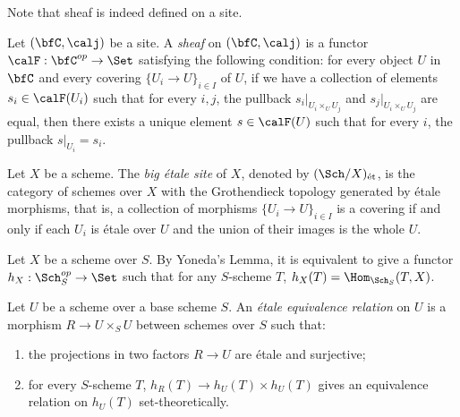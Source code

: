     Note that sheaf is indeed defined on a site.

    \begin{definition}\label{def:sheaves_on_site}
        Let \((\bfC, \calj)\) be a site.
        A \emph{sheaf} on \((\bfC, \calj)\) is a functor \(\calF: \bfC^{op} \to \Set\) satisfying the following condition:
        for every object \(U\) in \(\bfC\) and every covering \(\{U_i \to U\}_{i \in I}\) of \(U\), 
        if we have a collection of elements \(s_i \in \calF(U_i)\) such that for every \(i,j\), 
        the pullback \(s_i|_{U_i \times_U U_j}\) and \(s_j|_{U_i \times_U U_j}\) are equal, 
        then there exists a unique element \(s \in \calF(U)\) such that for every \(i\), the pullback \(s|_{U_i} = s_i\).
    \end{definition}

    \begin{definition}\label{def:big_etale_site}
        Let \(X\) be a scheme.
        The \emph{big \'etale site} of \(X\), denoted by \((\Sch/X)_{\text{\'et}}\), is the category of schemes over \(X\) with the Grothendieck topology generated by \'etale morphisms,
        that is, a collection of morphisms \(\{U_i \to U\}_{i \in I}\) is a covering if and only if each \(U_i\) is \'etale over \(U\) and the union of their images is the whole \(U\).
    \end{definition}

    Let \(X\) be a scheme over \(S\).
    By Yoneda's Lemma, it is equivalent to give a functor \(h_X: \Sch_S^{op} \to \Set\) such that for any \(S\)-scheme \(T\), \(h_X(T) = \Hom_{\Sch_S}(T, X)\).

    \begin{definition}\label{def:etale_equivalent_relation}
        Let \(U\) be a scheme over a base scheme \(S\).
        An \emph{\'etale equivalence relation} on \(U\) is a morphism \(R \to U \times_S U\) between schemes over \(S\) such that:
        \begin{enumerate}
            \item the projections in two factors \(R \to U\) are \'etale and surjective;
            \item for every \(S\)-scheme \(T\), \(h_R(T) \to h_U(T) \times h_U(T)\) gives an equivalence relation on \(h_U(T)\) set-theoretically.
        \end{enumerate}
    \end{definition}

